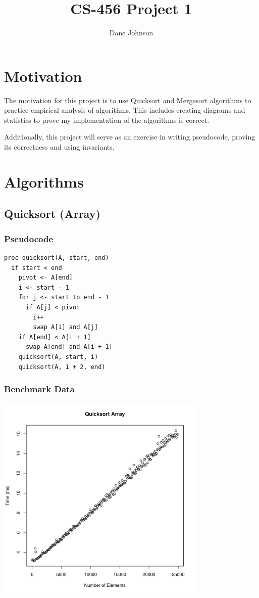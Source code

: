\documentclass[a4paper,12pt]{article}
\begin{document}
\title{CS-456 Project 1}
\author{Dane Johnson}
\maketitle
\section{Motivation}

The motivation for this project is to use Quicksort and Mergesort algorithms to practice empirical analysis of algorithms.
This includes creating diagrams and statistics to prove my implementation of the algorithms is correct.

Additionally, this project will serve as an exercise in writing pseudocode, proving its correctness and using invariants.
\section{Algorithms}
\subsection{Quicksort (Array)}
\subsubsection{Pseudocode}
\begin{verbatim}
proc quicksort(A, start, end)
  if start < end
    pivot <- A[end]
    i <- start - 1 
    for j <- start to end - 1
      if A[j] < pivot
        i++
        swap A[i] and A[j]
    if A[end] < A[i + 1]
      swap A[end] and A[i + 1]
    quicksort(A, start, i)
    quicksort(A, i + 2, end)
\end{verbatim}
\subsubsection{Benchmark Data}
\includegraphics[height=10cm]{quicksort_array}
\end{document}
